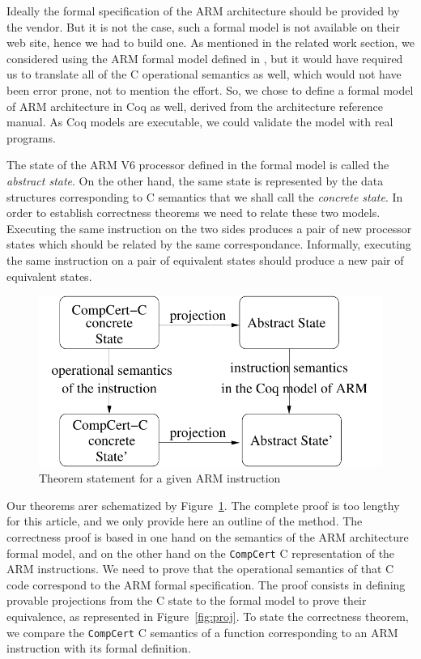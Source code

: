 \documentclass[twocolumn]{article}
\newcommand{\compcert}{\texttt{CompCert}\xspace}
\begin{document}
Ideally the formal specification of the ARM architecture should be
provided by the vendor. But it is not the case, such a formal model is
not available on their web site, hence we had to build one.  As
mentioned in the related work section, we considered using the ARM
formal model defined in \cite{FoxM10}, but it would have required us
to translate all of the C operational semantics as well, which would
not have been error prone, not to mention the effort. So, we chose to
define a formal model of ARM architecture in Coq as well, derived from
the architecture reference manual. As Coq models are executable, we
could validate the model with real programs.

The state of the ARM V6 processor defined in the formal model is called
the \emph{abstract state}.  On the other hand, the same state is
represented by the data structures corresponding to C semantics that
we shall call the \emph{concrete state}.  In order to establish
correctness theorems we need to relate these two models.  Executing
the same instruction on the two sides produces a pair of new processor
states which should be related by the same correspondance. Informally,
executing the same instruction on a pair of equivalent states should
produce a new pair of equivalent states.

\begin{figure}
\hfil\includegraphics[width=.75\linewidth]{fig/theoremca.pdf}
\caption{Theorem statement for a given ARM instruction}
\label{fig:theoca}
\end{figure}

Our theorems arer schematized by Figure~\ref{fig:theoca}. The complete
proof is too lengthy for this article, and we only provide here an
outline of the method.  The correctness proof is based in one hand on
the semantics of the ARM architecture formal model, and on the other
hand on the \compcert C representation of the ARM instructions. We
need to prove that the operational semantics of that C code correspond
to the ARM formal specification.  The proof consists in defining
provable projections from the C state to the formal model to prove
their equivalence, as represented in Figure~\ref{fig:proj}.  To state
the correctness theorem, we compare the \compcert C semantics of a
function corresponding to an ARM instruction with its formal
definition.
\end{document}
